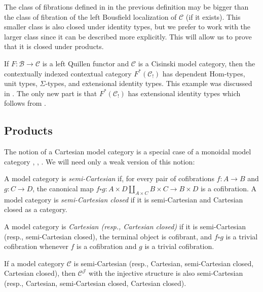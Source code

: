 \documentclass[reqno]{amsart}
\theoremstyle{definition}
\theoremstyle{remark}
\newcommand{\fs}[1]{\mathrm{#1}}
\newcommand{\scat}[1]{\mathcal{#1}}
\newcommand{\Hom}{\fs{Hom}}
\numberwithin{figure}{section}
\begin{document}
\begin{remark}
The class of fibrations defined in in the previous definition may be bigger than the class of fibration of the left Bousfield localization of $\scat{C}$ (if it exists).
This smaller class is also closed under identity types, but we prefer to work with the larger class since it can be described more explicitly.
This will allow us to prove that it is closed under products.
\end{remark}

\begin{example}
If $F : \scat{B} \to \scat{C}$ is a left Quillen functor and $\scat{C}$ is a Cisinski model category, then 
the contextually indexed contextual category $F^*(\scat{C}_!)$ has dependent $\Hom$-types, unit types, $\Sigma$-types, and extensional identity types.
This example was discussed in .
The only new part is that $F^*(\scat{C}_!)$ has extensional identity types which follows from .
\end{example}

\subsection{Products}

The notion of a Cartesian model category is a special case of a monoidal model category \cite[Definition~A.3.1.2]{lurie-topos}, \cite[Definition~4.2.6]{hovey}, \cite[Subsection~2.5]{segal-spaces}.
We will need only a weak version of this notion:

\begin{defn}
A model category is \emph{semi-Cartesian} if, for every pair of cofibrations $f : A \to B$ and $g : C \to D$,
the canonical map $f \square g : A \times D \amalg_{A \times C} B \times C \to B \times D$ is a cofibration.
A model category is \emph{semi-Cartesian closed} if it is semi-Cartesian and Cartesian closed as a category.
\end{defn}

\begin{remark}[cartesian]
A model category is \emph{Cartesian (resp., Cartesian closed)} if it is semi-Cartesian (resp., semi-Cartesian closed), the terminal object is cofibrant, and $f \square g$ is a trivial cofibration whenever $f$ is a cofibration and $g$ is a trivial cofibration.
\end{remark}

\begin{example}
If a model category $\scat{C}$ is semi-Cartesian (resp., Cartesian, semi-Cartesian closed, Cartesian closed), then $\scat{C}^\scat{J}$ with the injective structure is also semi-Cartesian (resp., Cartesian, semi-Cartesian closed, Cartesian closed).
\end{example}
\end{document}
